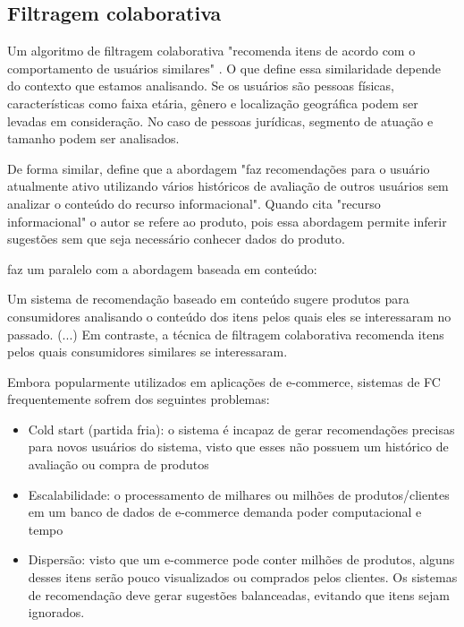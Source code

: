 \subsection{Filtragem colaborativa}
Um algoritmo de filtragem colaborativa "recomenda itens de acordo com o comportamento de usuários similares" \cite{fressato19}. O que define essa similaridade depende do contexto que estamos analisando. Se os usuários são pessoas físicas, características como faixa etária, gênero e localização geográfica podem ser levadas em consideração. No caso de pessoas jurídicas, segmento de atuação e tamanho podem ser analisados.

De forma similar,  define que a abordagem "faz recomendações para o usuário atualmente ativo utilizando vários históricos de avaliação de outros usuários sem analizar o conteúdo do recurso informacional". Quando cita "recurso informacional" o autor se refere ao produto, pois essa abordagem permite inferir sugestões sem que seja necessário conhecer dados do produto. 

 faz um paralelo com a abordagem baseada em conteúdo:

\begin{citacao}
Um sistema de recomendação baseado em conteúdo sugere produtos para consumidores analisando o conteúdo dos itens pelos quais eles se interessaram no passado. (...) Em contraste, a técnica de filtragem colaborativa recomenda itens pelos quais consumidores similares se interessaram. 
\end{citacao}

Embora popularmente utilizados em aplicações de e-commerce, sistemas de FC frequentemente sofrem dos seguintes problemas:
\begin{itemize}
    \item Cold start (partida fria): o sistema é incapaz de gerar recomendações precisas para novos usuários do sistema, visto que esses não possuem um histórico de avaliação ou compra de produtos \cite{fressato19}
    \item Escalabilidade: o processamento de milhares ou milhões de produtos/clientes em um banco de dados de e-commerce demanda poder computacional e tempo \cite{lee04}
    \item Dispersão: visto que um e-commerce pode conter milhões de produtos, alguns desses itens serão pouco visualizados ou comprados pelos clientes. Os sistemas de recomendação deve gerar sugestões balanceadas, evitando que itens sejam ignorados. \cite{lee04}
\end{itemize}

